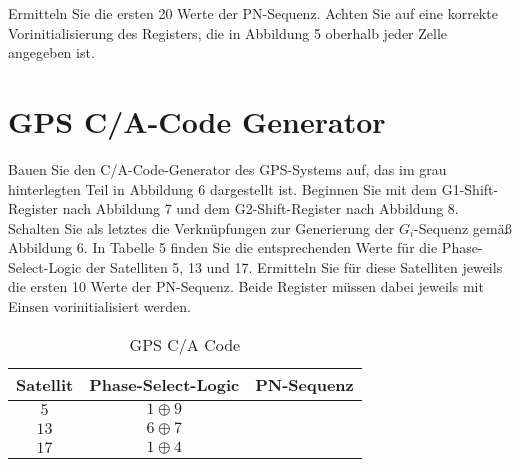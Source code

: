 \documentclass[10pt]{scrreprt}
\begin{document}
    \vspace{.5cm}

    Ermitteln Sie die ersten 20 Werte der PN-Sequenz. Achten Sie auf eine korrekte
    Vorinitialisierung des Registers, die in Abbildung 5 oberhalb jeder Zelle angegeben ist.

    \section{GPS C/A-Code Generator}
    Bauen Sie den C/A-Code-Generator des GPS-Systems auf, das im grau hinterlegten Teil
    in Abbildung 6 dargestellt ist. Beginnen Sie mit dem G1-Shift-Register nach Abbildung 7
    und dem G2-Shift-Register nach Abbildung 8. Schalten Sie als letztes die Verknüpfungen
    zur Generierung der $G_i$-Sequenz gemäß Abbildung 6. In Tabelle 5 finden Sie die
    entsprechenden Werte für die Phase-Select-Logic der Satelliten 5, 13 und 17. Ermitteln Sie für
    diese Satelliten jeweils die ersten 10 Werte der PN-Sequenz. Beide Register müssen dabei
    jeweils mit Einsen vorinitialisiert werden.
    \begin{table}[H]
        \centering
        \begin{tabular}{ccc}
            \toprule
            Satellit & Phase-Select-Logic & PN-Sequenz\\
            \midrule
            $5$ & $1 \oplus 9$ & \\
            $13$ & $6 \oplus 7$ & \\
            $17$ & $1 \oplus 4$ & \\
            \bottomrule
        \end{tabular}
        \caption{GPS C/A Code}
        \label{tab:GPS}
    \end{table}
\end{document}
